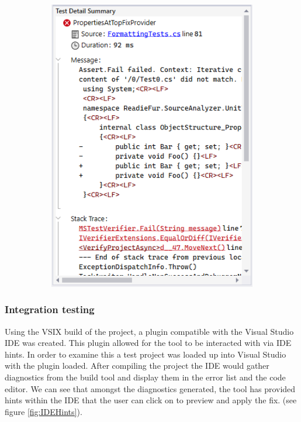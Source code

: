 \begin{figure}[H]
\begin{subfigure}[t]{0.35\textwidth}
        \includegraphics[width=\linewidth, height=0.35\textheight, keepaspectratio]{Figures/UnitTestFailing.png}
    \end{subfigure}
\end{figure}


\subsubsection{Integration testing}
Using the VSIX build of the project, a plugin compatible with the Visual Studio IDE was created. This plugin allowed for the tool to be interacted with via IDE hints. In order to examine this a test project was loaded up into Visual Studio with the plugin loaded. After compiling the project the IDE would gather diagnostics from the build tool and display them in the error list and the code editor. We can see that amongst the diagnostics generated, the tool has provided hints within the IDE that the user can click on to preview and apply the fix. (see figure \ref{fig:IDEHints}).

